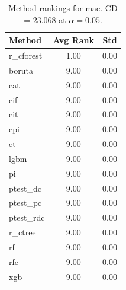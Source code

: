 \begin{table}[h]
\centering
\caption{Method rankings for mae. CD = 23.068 at $\alpha=0.05$.}
\label{tab:ranks_mae}
\begin{tabular}{lcc}
\toprule
Method & Avg Rank & Std \\
\midrule
r_cforest & 1.00 & 0.00 \\
boruta & 9.00 & 0.00 \\
cat & 9.00 & 0.00 \\
cif & 9.00 & 0.00 \\
cit & 9.00 & 0.00 \\
cpi & 9.00 & 0.00 \\
et & 9.00 & 0.00 \\
lgbm & 9.00 & 0.00 \\
pi & 9.00 & 0.00 \\
ptest_dc & 9.00 & 0.00 \\
ptest_pc & 9.00 & 0.00 \\
ptest_rdc & 9.00 & 0.00 \\
r_ctree & 9.00 & 0.00 \\
rf & 9.00 & 0.00 \\
rfe & 9.00 & 0.00 \\
xgb & 9.00 & 0.00 \\
\bottomrule
\end{tabular}
\end{table}